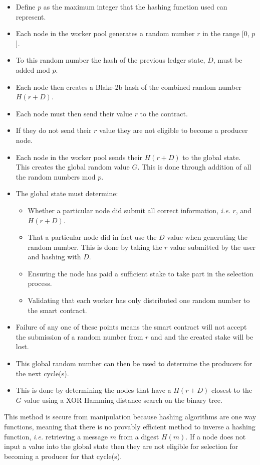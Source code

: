 \begin{itemize}

\item Define $p$ as the maximum integer that the hashing function used can represent.
\item Each node in the worker pool generates a random number $r$ in the range [0, $p$].
\item To this random number the hash of the previous ledger state, $D$, must be added mod $p$.
\item Each node then creates a Blake-2b hash of the combined random number $H(r + D)$.
\item Each node must then send their value $r$ to the contract.
\item If they do not send their $r$ value they are not eligible to become a producer node.
\item Each node in the worker pool sends their $H(r + D)$ to the global state. This creates the global random value $G$. This is done through addition of all the random numbers mod $p$.
\item The global state must determine:
\begin{itemize}
\item Whether a particular node did submit all correct information, \textit{i.e.} $r$, and $H(r+D)$.
\item That a particular node did in fact use the $D$ value when generating the random number. This is done by taking the $r$ value submitted by the user and hashing with $D$.
\item Ensuring the node has paid a sufficient stake to take part in the selection process.
\item Validating that each worker has only distributed one random number to the smart contract.
\end{itemize}
\item Failure of any one of these points means the smart contract will not accept the submission of a random number from $r$ and and the created stake will be lost.
\item This global random number can then be used to determine the producers for the next cycle(s).
\item This is done by determining the nodes that have a $H(r + D)$ closest to the $G$ value using a XOR Hamming distance search on the binary tree.\\

\end{itemize}

This method is secure from manipulation because hashing algorithms are one way functions, meaning that there is no provably efficient method to inverse a hashing function, \textit{i.e.} retrieving a message $m$ from a digest $H(m)$. If a node does not input a value into the global state then they are not eligible for selection for becoming a producer for that cycle(s). \\

